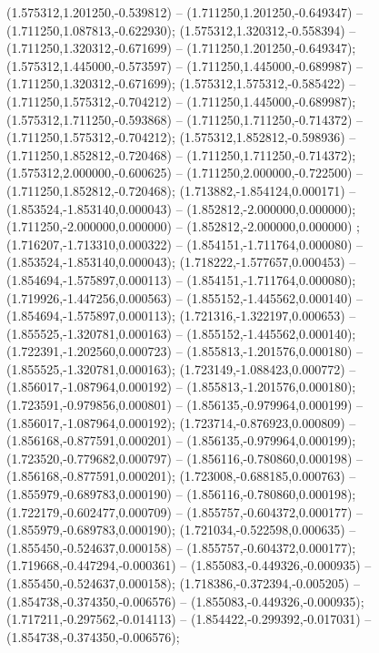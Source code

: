  (1.575312,1.201250,-0.539812) -- (1.711250,1.201250,-0.649347) -- (1.711250,1.087813,-0.622930);
 (1.575312,1.320312,-0.558394) -- (1.711250,1.320312,-0.671699) -- (1.711250,1.201250,-0.649347);
 (1.575312,1.445000,-0.573597) -- (1.711250,1.445000,-0.689987) -- (1.711250,1.320312,-0.671699);
 (1.575312,1.575312,-0.585422) -- (1.711250,1.575312,-0.704212) -- (1.711250,1.445000,-0.689987);
 (1.575312,1.711250,-0.593868) -- (1.711250,1.711250,-0.714372) -- (1.711250,1.575312,-0.704212);
 (1.575312,1.852812,-0.598936) -- (1.711250,1.852812,-0.720468) -- (1.711250,1.711250,-0.714372);
 (1.575312,2.000000,-0.600625) -- (1.711250,2.000000,-0.722500) -- (1.711250,1.852812,-0.720468);
 (1.713882,-1.854124,0.000171) -- (1.853524,-1.853140,0.000043) -- (1.852812,-2.000000,0.000000);
 (1.711250,-2.000000,0.000000) -- (1.852812,-2.000000,0.000000) ;
 (1.716207,-1.713310,0.000322) -- (1.854151,-1.711764,0.000080) -- (1.853524,-1.853140,0.000043);
 (1.718222,-1.577657,0.000453) -- (1.854694,-1.575897,0.000113) -- (1.854151,-1.711764,0.000080);
 (1.719926,-1.447256,0.000563) -- (1.855152,-1.445562,0.000140) -- (1.854694,-1.575897,0.000113);
 (1.721316,-1.322197,0.000653) -- (1.855525,-1.320781,0.000163) -- (1.855152,-1.445562,0.000140);
 (1.722391,-1.202560,0.000723) -- (1.855813,-1.201576,0.000180) -- (1.855525,-1.320781,0.000163);
 (1.723149,-1.088423,0.000772) -- (1.856017,-1.087964,0.000192) -- (1.855813,-1.201576,0.000180);
 (1.723591,-0.979856,0.000801) -- (1.856135,-0.979964,0.000199) -- (1.856017,-1.087964,0.000192);
 (1.723714,-0.876923,0.000809) -- (1.856168,-0.877591,0.000201) -- (1.856135,-0.979964,0.000199);
 (1.723520,-0.779682,0.000797) -- (1.856116,-0.780860,0.000198) -- (1.856168,-0.877591,0.000201);
 (1.723008,-0.688185,0.000763) -- (1.855979,-0.689783,0.000190) -- (1.856116,-0.780860,0.000198);
 (1.722179,-0.602477,0.000709) -- (1.855757,-0.604372,0.000177) -- (1.855979,-0.689783,0.000190);
 (1.721034,-0.522598,0.000635) -- (1.855450,-0.524637,0.000158) -- (1.855757,-0.604372,0.000177);
 (1.719668,-0.447294,-0.000361) -- (1.855083,-0.449326,-0.000935) -- (1.855450,-0.524637,0.000158);
 (1.718386,-0.372394,-0.005205) -- (1.854738,-0.374350,-0.006576) -- (1.855083,-0.449326,-0.000935);
 (1.717211,-0.297562,-0.014113) -- (1.854422,-0.299392,-0.017031) -- (1.854738,-0.374350,-0.006576);
